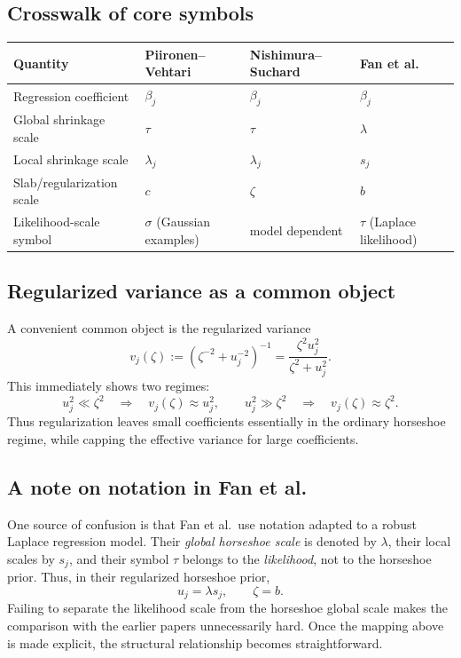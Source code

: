 \documentclass[11pt]{article}
\begin{document}
\subsection{Crosswalk of core symbols}

\begin{center}
\renewcommand{\arraystretch}{1.2}
\begin{tabular}{>{\raggedright\arraybackslash}p{} >{\raggedright\arraybackslash}p{} >{\raggedright\arraybackslash}p{} >{\raggedright\arraybackslash}p{}}
\toprule
Quantity & Piironen--Vehtari & Nishimura--Suchard & Fan et al. \\
\midrule
Regression coefficient & $\beta_j$ & $\beta_j$ & $\beta_j$ \\
Global shrinkage scale & $\tau$ & $\tau$ & $\lambda$ \\
Local shrinkage scale & $\lambda_j$ & $\lambda_j$ & $s_j$ \\
Slab/regularization scale & $c$ & $\zeta$ & $b$ \\
Likelihood-scale symbol & $\sigma$ (Gaussian examples) & model dependent & $\tau$ (Laplace likelihood) \\
\bottomrule
\end{tabular}
\end{center}

\subsection{Regularized variance as a common object}

A convenient common object is the regularized variance
\begin{equation}
v_j(\zeta) 
:= 
\left(\zeta^{-2}+u_j^{-2}\right)^{-1}
=
\frac{\zeta^2 u_j^2}{\zeta^2+u_j^2}.
\label{eq:regvar}
\end{equation}
This immediately shows two regimes:
\[
u_j^2 \ll \zeta^2
\quad \Longrightarrow \quad
v_j(\zeta)\approx u_j^2,
\qquad
u_j^2 \gg \zeta^2
\quad \Longrightarrow \quad
v_j(\zeta)\approx \zeta^2.
\]
Thus regularization leaves small coefficients essentially in the ordinary horseshoe regime, while capping the effective variance for large coefficients.

\subsection{A note on notation in Fan et al.}

One source of confusion is that Fan et al.\ use notation adapted to a robust Laplace regression model. Their \emph{global horseshoe scale} is denoted by $\lambda$, their local scales by $s_j$, and their symbol $\tau$ belongs to the \emph{likelihood}, not to the horseshoe prior. Thus, in their regularized horseshoe prior,
\[
u_j = \lambda s_j,
\qquad
\zeta = b.
\]
Failing to separate the likelihood scale from the horseshoe global scale makes the comparison with the earlier papers unnecessarily hard. Once the mapping above is made explicit, the structural relationship becomes straightforward.
\end{document}
